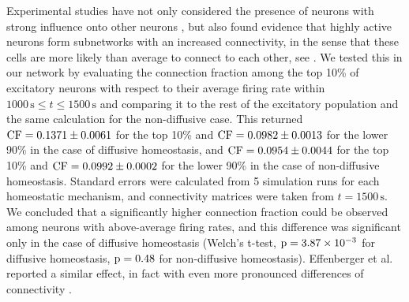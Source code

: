 \documentclass[10pt,letterpaper]{article}
\begin{document}
Experimental studies have not only considered the presence of neurons with strong influence onto other neurons \cite{Eckmann_Leader_Neurons_2008}, but also found evidence that highly active neurons form subnetworks with an increased connectivity, in the sense that these cells are more likely than average to connect to each other, see \cite{Yassin_Subnetworks_2010}. We tested this in our network by evaluating the connection fraction among the top 10\% of excitatory neurons with respect to their average firing rate within $\mathrm{1000\,s} \leq t \leq \mathrm{1500\,s}$ and comparing it to the rest of the excitatory population and the same calculation for the non-diffusive case. This returned $\rm CF= 0.1371 \pm 0.0061$ for the top 10\% and $\rm CF = 0.0982 \pm 0.0013$ for the lower 90\% in the case of diffusive homeostasis, and  $\rm CF = 0.0954 \pm 0.0044$ for the top 10\% and $\rm CF = 0.0992 \pm 0.0002$ for the lower 90\% in the case of non-diffusive homeostasis. Standard errors were calculated from 5 simulation runs for each homeostatic mechanism, and connectivity matrices were taken from $t = \mathrm{1500\,s}$. We concluded that a significantly higher connection fraction could be observed among neurons with above-average firing rates, and this difference was significant only in the case of diffusive homeostasis (Welch's t-test, $\rm p = 3.87 \times 10 ^ {-3}$ for diffusive homeostasis, $\rm p = 0.48$ for non-diffusive homeostasis). Effenberger et al. reported a similar effect, in fact with even more pronounced differences of connectivity \cite{Effenberger_2015}.
\end{document}
